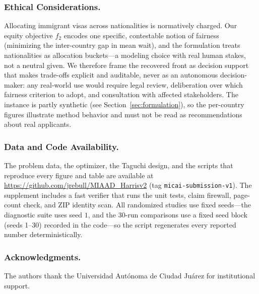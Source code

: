 \documentclass[runningheads]{llncs}
\begin{document}
\subsubsection*{Ethical Considerations.}
Allocating immigrant visas across nationalities is normatively charged. Our equity objective $f_2$ encodes one specific, contestable notion of fairness (minimizing the inter-country gap in mean wait), and the formulation treats nationalities as allocation buckets---a modeling choice with real human stakes, not a neutral given. We therefore frame the recovered front as decision support that makes trade-offs explicit and auditable, never as an autonomous decision-maker: any real-world use would require legal review, deliberation over which fairness criterion to adopt, and consultation with affected stakeholders. The instance is partly synthetic (see Section~\ref{sec:formulation}), so the per-country figures illustrate method behavior and must not be read as recommendations about real applicants.

\subsubsection*{Data and Code Availability.}
The problem data, the optimizer, the Taguchi design, and the scripts that reproduce every figure and table are available at \url{https://github.com/jrebull/MIAAD_Harrisv2} (tag \texttt{micai-submission-v1}). The supplement includes a fast verifier that runs the unit tests, claim firewall, page-count check, and ZIP identity scan. All randomized studies use fixed seeds---the diagnostic suite uses seed $1$, and the 30-run comparisons use a fixed seed block (seeds 1--30) recorded in the code---so the script regenerates every reported number deterministically.

\subsubsection*{Acknowledgments.}
The authors thank the Universidad Aut\'onoma de Ciudad Ju\'arez for institutional support.
\end{document}
